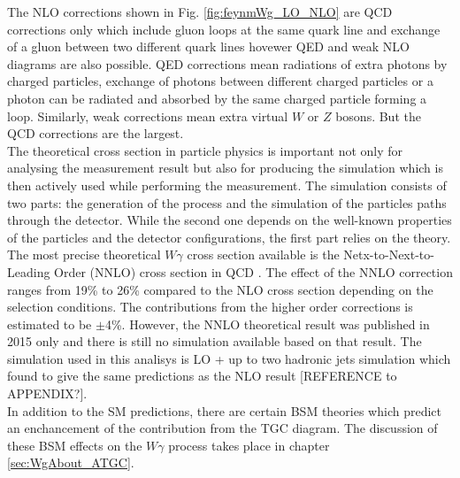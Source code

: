 The NLO corrections shown in Fig. \ref{fig:feynmWg_LO_NLO} are QCD corrections only which include gluon loops at the same quark line and exchange of a gluon between two different quark lines hovewer QED and weak NLO diagrams are also possible. QED corrections mean radiations of extra photons by charged particles, exchange of photons between different charged particles or a photon can be radiated and absorbed by the same charged particle forming a loop. Similarly, weak corrections mean extra virtual $W$ or $Z$ bosons. But the QCD corrections are the largest.\\

The theoretical cross section in particle physics is important not only for analysing the measurement result but also for producing the simulation which is then actively used while performing the measurement. The simulation consists of two parts: the generation of the process and the simulation of the particles paths through the detector. While the second one depends on the well-known properties of the particles and the detector configurations, the first part relies on the theory.\\  

The most precise theoretical $W\gamma$ cross section available is the Netx-to-Next-to-Leading Order (NNLO) cross section in QCD \cite{ref_theory_NNLO}. The effect of the NNLO correction ranges from 19\% to 26\% compared to the NLO cross section depending on the selection conditions. The contributions from the higher order corrections is estimated to be $\pm$4\%. However, the NNLO theoretical result was published in 2015 only and there is still no simulation available based on that result. The simulation used in this analisys is LO + up to two hadronic jets simulation which found to give the same predictions as the NLO result [REFERENCE to APPENDIX?].\\

In addition to the SM predictions, there are certain BSM theories which predict an enchancement of the contribution from the TGC diagram. The discussion of these BSM effects on the $W\gamma$ process takes place in chapter \ref{sec:WgAbout_ATGC}.\\ 


